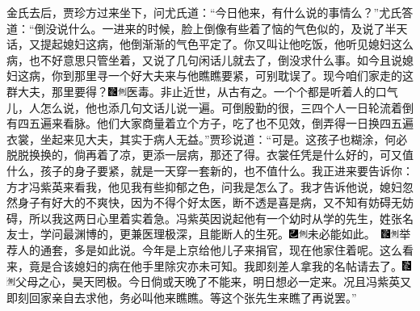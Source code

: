 金氏去后，贾珍方过来坐下，问尤氏道：``今日他来，有什么说的事情么？''尤氏答道：``倒没说什么。一进来的时候，脸上倒像有些着了恼的气色似的，及说了半天话，又提起媳妇这病，他倒渐渐的气色平定了。你又叫让他吃饭，他听见媳妇这么病，也不好意思只管坐着，又说了几句闲话儿就去了，倒没求什么事。如今且说媳妇这病，你到那里寻一个好大夫来与他瞧瞧要紧，可别耽误了。现今咱们家走的这群大夫，那里要得？{\includegraphics[width=3mm]{../Images/00006}\includegraphics[width=3mm]{../Images/00011}\footnotesize \kaishu 医毒。非止近世，从古有之。}一个个都是听着人的口气儿，人怎么说，他也添几句文话儿说一遍。可倒殷勤的很，三四个人一日轮流着倒有四五遍来看脉。他们大家商量着立个方子，吃了也不见效，倒弄得一日换四五遍衣裳，坐起来见大夫，其实于病人无益。''贾珍说道：``可是。这孩子也糊涂，何必脱脱换换的，倘再着了凉，更添一层病，那还了得。衣裳任凭是什么好的，可又值什么，孩子的身子要紧，就是一天穿一套新的，也不值什么。我正进来要告诉你：方才冯紫英来看我，他见我有些抑郁之色，问我是怎么了。我才告诉他说，媳妇忽然身子有好大的不爽快，因为不得个好太医，断不透是喜是病，又不知有妨碍无妨碍，所以我这两日心里着实着急。冯紫英因说起他有一个幼时从学的先生，姓张名友士，学问最渊博的，更兼医理极深，且能断人的生死。{\includegraphics[width=3mm]{../Images/00003}\includegraphics[width=3mm]{../Images/00011}\footnotesize \kaishu 未必能如此。　\includegraphics[width=3mm]{../Images/00006}\includegraphics[width=3mm]{../Images/00011}\footnotesize \kaishu 举荐人的通套，多是如此说。}今年是上京给他儿子来捐官，现在他家住着呢。这么看来，竟是合该媳妇的病在他手里除灾亦未可知。我即刻差人拿我的名帖请去了。{\includegraphics[width=3mm]{../Images/00006}\includegraphics[width=3mm]{../Images/00011}\footnotesize \kaishu 父母之心，昊天罔极。}今日倘或天晚了不能来，明日想必一定来。况且冯紫英又即刻回家亲自去求他，务必叫他来瞧瞧。等这个张先生来瞧了再说罢。''

